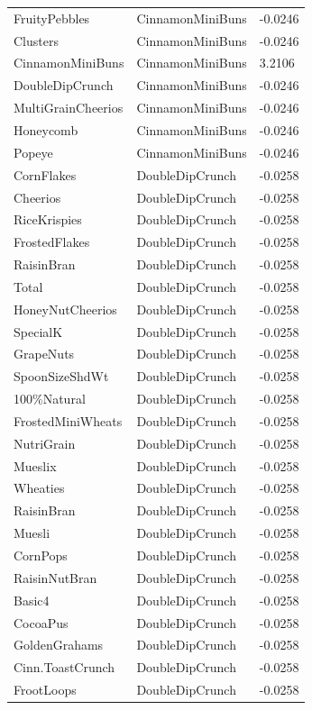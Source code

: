 \begin{table}[!htbp]
\begin{tabular}{lll}
\\
FruityPebbles & CinnamonMiniBuns & -0.0246
\\
Clusters & CinnamonMiniBuns & -0.0246
\\
CinnamonMiniBuns & CinnamonMiniBuns & 3.2106
\\
DoubleDipCrunch & CinnamonMiniBuns & -0.0246
\\
MultiGrainCheerios & CinnamonMiniBuns & -0.0246
\\
Honeycomb & CinnamonMiniBuns & -0.0246
\\
Popeye & CinnamonMiniBuns & -0.0246
\\
CornFlakes & DoubleDipCrunch & -0.0258
\\
Cheerios & DoubleDipCrunch & -0.0258
\\
RiceKrispies & DoubleDipCrunch & -0.0258
\\
FrostedFlakes & DoubleDipCrunch & -0.0258
\\
RaisinBran & DoubleDipCrunch & -0.0258
\\
Total & DoubleDipCrunch & -0.0258
\\
HoneyNutCheerios & DoubleDipCrunch & -0.0258
\\
SpecialK & DoubleDipCrunch & -0.0258
\\
GrapeNuts & DoubleDipCrunch & -0.0258
\\
SpoonSizeShdWt & DoubleDipCrunch & -0.0258
\\
100\%Natural & DoubleDipCrunch & -0.0258
\\
FrostedMiniWheats & DoubleDipCrunch & -0.0258
\\
NutriGrain & DoubleDipCrunch & -0.0258
\\
Mueslix & DoubleDipCrunch & -0.0258
\\
Wheaties & DoubleDipCrunch & -0.0258
\\
RaisinBran & DoubleDipCrunch & -0.0258
\\
Muesli & DoubleDipCrunch & -0.0258
\\
CornPops & DoubleDipCrunch & -0.0258
\\
RaisinNutBran & DoubleDipCrunch & -0.0258
\\
Basic4 & DoubleDipCrunch & -0.0258
\\
CocoaPus & DoubleDipCrunch & -0.0258
\\
GoldenGrahams & DoubleDipCrunch & -0.0258
\\
Cinn.ToastCrunch & DoubleDipCrunch & -0.0258
\\
FrootLoops & DoubleDipCrunch & -0.0258
\\

\end{tabular}
\end{table}
